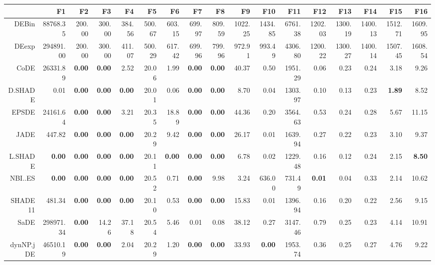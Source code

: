 \begin{table}[h!]
\centering
\begingroup\tiny
\begin{tabular}{rrrrrrrrrrrrrrrrr}
  \hline
 & F1 & F2 & F3 & F4 & F5 & F6 & F7 & F8 & F9 & F10 & F11 & F12 & F13 & F14 & F15 & F16 \\ 
  \hline
DEBin & 88768.35 & 200.00 & 300.00 & 384.56 & 500.67 & 603.15 & 699.97 & 809.59 & 1022.25 & 1434.85 & 6761.38 & 1202.03 & 1300.19 & 1400.13 & 1512.71 & 1609.95 \\ 
  DEexp & 294891.00 & 200.00 & 300.00 & 411.07 & 500.29 & 617.42 & 699.96 & 799.96 & 972.91 & 993.49 & 4306.80 & 1200.22 & 1300.27 & 1400.14 & 1507.45 & 1608.54 \\ 
  CoDE & 26331.89 & \textbf{0.00} & \textbf{0.00} & 2.52 & 20.06 & 1.99 & \textbf{0.00} & \textbf{0.00} & 40.37 & 0.50 & 1951.29 & 0.06 & 0.23 & 0.24 & 3.18 & 9.26 \\ 
  D.SHADE & 0.01 & \textbf{0.00} & \textbf{0.00} & \textbf{0.00} & 20.01 & 0.06 & \textbf{0.00} & \textbf{0.00} & 8.70 & 0.04 & 1303.97 & 0.10 & 0.13 & 0.23 & \textbf{1.89} & 8.52 \\ 
  EPSDE & 24161.64 & \textbf{0.00} & \textbf{0.00} & 3.21 & 20.35 & 18.89 & \textbf{0.00} & \textbf{0.00} & 44.36 & 0.20 & 3564.63 & 0.53 & 0.24 & 0.28 & 5.67 & 11.15 \\ 
  JADE & 447.82 & \textbf{0.00} & \textbf{0.00} & \textbf{0.00} & 20.29 & 9.42 & \textbf{0.00} & \textbf{0.00} & 26.17 & 0.01 & 1639.94 & 0.27 & 0.22 & 0.23 & 3.10 & 9.37 \\ 
  L.SHADE & \textbf{0.00} & \textbf{0.00} & \textbf{0.00} & \textbf{0.00} & 20.11 & \textbf{0.00} & \textbf{0.00} & \textbf{0.00} & 6.78 & 0.02 & 1229.48 & 0.16 & 0.12 & 0.24 & 2.15 & \textbf{8.50} \\ 
  NBI..ES & \textbf{0.00} & \textbf{0.00} & \textbf{0.00} & \textbf{0.00} & 20.52 & 0.71 & \textbf{0.00} & 9.98 & 3.24 & 636.00 & 731.49 & \textbf{0.01} & 0.04 & 0.33 & 2.14 & 10.62 \\ 
  SHADE11 & 481.34 & \textbf{0.00} & \textbf{0.00} & \textbf{0.00} & 20.10 & 0.53 & \textbf{0.00} & \textbf{0.00} & 15.83 & 0.01 & 1396.94 & 0.16 & 0.20 & 0.22 & 2.56 & 9.15 \\ 
  SaDE & 298971.34 & \textbf{0.00} & 14.26 & 37.18 & 20.54 & 5.46 & 0.01 & 0.08 & 38.12 & 0.27 & 3147.46 & 0.79 & 0.25 & 0.23 & 4.14 & 10.91 \\ 
  dynNP.jDE & 46510.19 & \textbf{0.00} & \textbf{0.00} & 2.04 & 20.29 & 1.20 & \textbf{0.00} & \textbf{0.00} & 33.93 & \textbf{0.00} & 1953.74 & 0.36 & 0.25 & 0.27 & 4.76 & 9.22 \\ 

\end{tabular}
\end{table}
